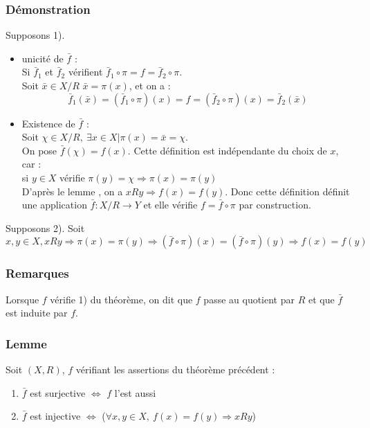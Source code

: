 \documentclass[a4paper, oneside]{report}
\theoremstyle{break}
\begin{document}
\subsubsection{Démonstration}
Supposons 1).\\
\begin{itemize}
\item unicité de $\bar{f}$ :\\
Si $\bar{f}_1$ et $\bar{f}_2$ vérifient $\bar{f}_1\circ \pi = f = \bar{f}_2 \circ \pi$.\\
Soit $\bar{x}\in X/R$ $\bar{x}=\pi(x)$, et on a :
$$\bar{f}_1(\bar{x})=(\bar{f}_1\circ \pi)(x)=f=(\bar{f}_2\circ \pi)(x)=\bar{f}_2(\bar{x})$$

\item Existence de $\bar{f}$ :\\
Soit $\chi\in X/R,~\exists x\in X | \pi(x)=\bar{x}=\chi$.\\
On pose $\bar{f}(\chi)=f(x)$. Cette définition est indépendante du choix de $x$, car :\\
si $y\in X$ vérifie $\pi(y)=\chi\Rightarrow \pi(x)=\pi(y)$\\
D'après le lemme , on a $xRy \Rightarrow f(x)=f(y)$. Donc cette définition définit une application $\bar{f}:X/R \rightarrow Y$ et elle vérifie $f=\bar{f}\circ \pi$ par construction.\\
\end{itemize}

Supposons 2). Soit $x,y\in X, xRy \Rightarrow \pi(x)=\pi(y)\Rightarrow (\bar{f}\circ \pi)(x)=(\bar{f}\circ \pi)(y)\Rightarrow f(x)=f(y)$

\subsubsection{Remarques}
Lorsque $f$ vérifie 1) du théorème, on dit que $f$ passe au quotient par $R$ et que $\bar{f}$ est induite par $f$.\\

\subsubsection{Lemme}
Soit $(X,R)$, $f$ vérifiant les assertions du théorème précédent :
\begin{enumerate}
\item $\bar{f}$ est surjective $\Leftrightarrow$ $f$ l'est aussi
\item $\bar{f}$ est injective $\Leftrightarrow$ ($\forall x,y\in X,~f(x)=f(y)\Rightarrow xRy$)
\end{enumerate}
\end{document}
